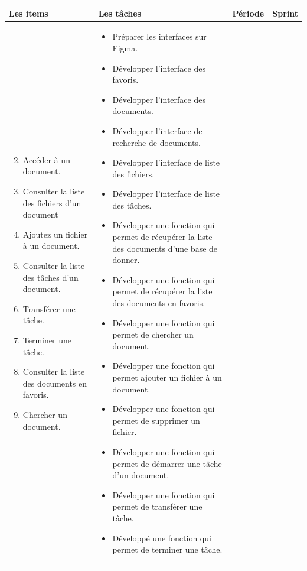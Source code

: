 \begin{longtable}{|p{4cm}|p{7cm}|p{2cm}|p{2cm}|}
  \hline
  \textbf{Les items} &\textbf{Les tâches} & \textbf{Période} & \textbf{Sprint} \\
  \hline
  \vspace{-\baselineskip}
  \begin{enumerate}
    \setcounter{enumi}{1}
    \itemsep0em 
      \item Accéder à un document.
      \item Consulter la liste des fichiers d'un document
      \item Ajoutez un fichier à un document.
      \item Consulter la liste des tâches d'un document.
      \item Transférer une tâche.
      \item Terminer une tâche.
      \item Consulter la liste des documents en favoris.
      \item Chercher un document.
      

  \end{enumerate}
  &
  \vspace{-\baselineskip}
  \begin{itemize}
    \itemsep0em 
    \item Préparer les interfaces sur Figma.
    \item Développer l'interface des favoris.
    \item Développer l'interface des documents.
    \item Développer l'interface de recherche de documents.
    \item Développer l'interface de liste des fichiers.
    \item Développer l'interface de liste des tâches.
    \item Développer une fonction qui permet de récupérer la liste des documents d'une base de donner.
    \item Développer une fonction qui permet de récupérer la liste des documents en favoris.
    \item Développer une fonction qui permet de chercher un document.
    \item Développer une fonction qui permet ajouter un fichier à un document.
    \item Développer une fonction qui permet de supprimer un fichier.
    \item Développer une fonction qui permet de démarrer une tâche d'un document.
    \item Développer une fonction qui permet de transférer une tâche.
    \item Développé une fonction qui permet de terminer une tâche.


\end{itemize}
\end{longtable}
